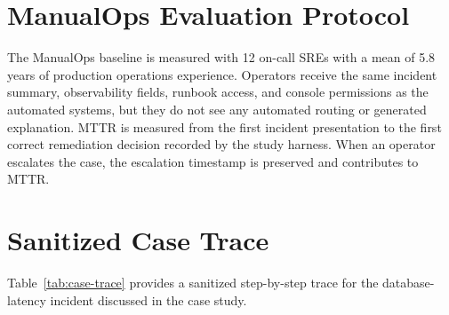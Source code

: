 \documentclass[conference]{IEEEtran}
\begin{document}
\section{ManualOps Evaluation Protocol}
\label{app:manualops}
The ManualOps baseline is measured with 12 on-call SREs with a mean of 5.8 years of production operations experience. Operators receive the same incident summary, observability fields, runbook access, and console permissions as the automated systems, but they do not see any automated routing or generated explanation. MTTR is measured from the first incident presentation to the first correct remediation decision recorded by the study harness. When an operator escalates the case, the escalation timestamp is preserved and contributes to MTTR.

\section{Sanitized Case Trace}
\label{app:case-trace}
Table~\ref{tab:case-trace} provides a sanitized step-by-step trace for the database-latency incident discussed in the case study.

\begin{table}[t]
\centering
\caption{Sanitized case trace for a database-latency incident.}
\label{tab:case-trace}
\end{table}
\end{document}
